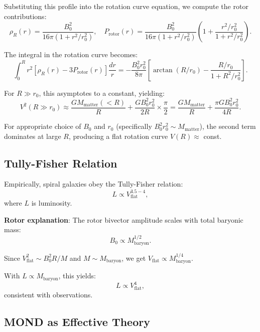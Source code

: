 \documentclass[12pt,a4paper]{article}
\theoremstyle{definition}
\theoremstyle{remark}
\begin{document}
Substituting this profile into the rotation curve equation, we compute the rotor contributions:
\begin{equation}
\rho_R(r) = \frac{B_0^2}{16\pi(1 + r^2/r_0^2)}, \quad P_{\text{rotor}}(r) = \frac{B_0^2}{16\pi(1 + r^2/r_0^2)} \left(1 + \frac{r^2/r_0^2}{1 + r^2/r_0^2}\right).
\end{equation}

The integral in the rotation curve becomes:
\begin{equation}
\int_0^R r^2 [\rho_R(r) - 3P_{\text{rotor}}(r)] \frac{dr}{r} = -\frac{B_0^2 r_0^2}{8\pi} \left[\arctan(R/r_0) - \frac{R/r_0}{1 + R^2/r_0^2}\right].
\end{equation}

For $R \gg r_0$, this asymptotes to a constant, yielding:
\begin{equation}
V^2(R \gg r_0) \approx \frac{GM_{\text{matter}}(<R)}{R} + \frac{G B_0^2 r_0^2}{2R} \times \frac{\pi}{2} = \frac{GM_{\text{matter}}}{R} + \frac{\pi G B_0^2 r_0^2}{4R}.
\end{equation}

For appropriate choice of $B_0$ and $r_0$ (specifically $B_0^2 r_0^2 \sim M_{\text{matter}}$), the second term dominates at large $R$, producing a flat rotation curve $V(R) \approx$ const.

\subsection{Tully-Fisher Relation}

Empirically, spiral galaxies obey the Tully-Fisher relation:
\begin{equation}
L \propto V_{\text{flat}}^{3.5-4},
\end{equation}
where $L$ is luminosity.

\textbf{Rotor explanation}: The rotor bivector amplitude scales with total baryonic mass:
\begin{equation}
B_0 \propto M_{\text{baryon}}^{1/2}.
\end{equation}

Since $V_{\text{flat}}^2 \sim B_0^2 R / M$ and $M \sim M_{\text{baryon}}$, we get $V_{\text{flat}} \propto M_{\text{baryon}}^{1/4}$.

With $L \propto M_{\text{baryon}}$, this yields:
\begin{equation}
L \propto V_{\text{flat}}^4,
\end{equation}
consistent with observations.

\subsection{MOND as Effective Theory}
\end{document}
